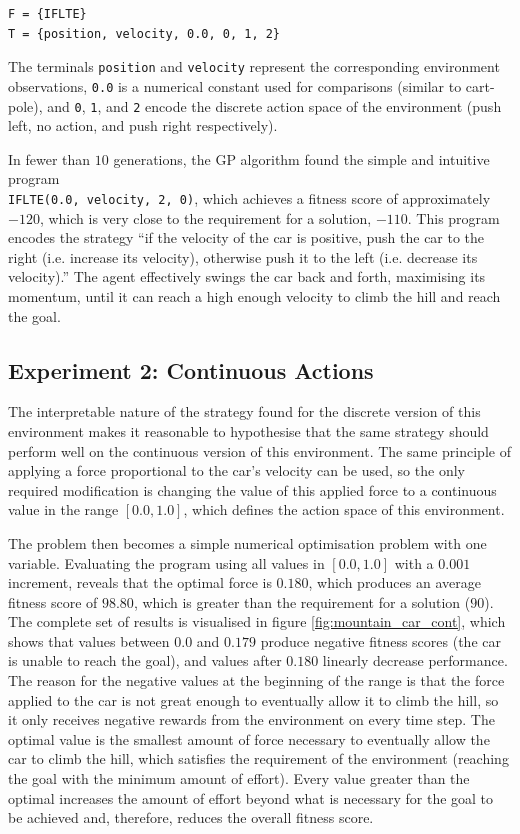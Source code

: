 \begin{verbatim}
F = {IFLTE}
T = {position, velocity, 0.0, 0, 1, 2}
\end{verbatim}
The terminals \verb+position+ and \verb+velocity+ represent the corresponding environment observations, \verb+0.0+ is a numerical constant used for comparisons (similar to cart-pole), and \verb+0+, \verb+1+, and \verb+2+ encode the discrete action space of the environment (push left, no action, and push right respectively).

In fewer than $10$ generations, the GP algorithm found the simple and intuitive program \\\verb+IFLTE(0.0, velocity, 2, 0)+, which achieves a fitness score of approximately $-120$, which is very close to the requirement for a solution, $-110$. This program encodes the strategy “if the velocity of the car is positive, push the car to the right (i.e. increase its velocity), otherwise push it to the left (i.e. decrease its velocity).” The agent effectively swings the car back and forth, maximising its momentum, until it can reach a high enough velocity to climb the hill and reach the goal. 

\subsection{Experiment 2: Continuous Actions}
The interpretable nature of the strategy found for the discrete version of this environment makes it reasonable to hypothesise that the same strategy should perform well on the continuous version of this environment. The same principle of applying a force proportional to the car’s velocity can be used, so the only required modification is changing the value of this applied force to a continuous value in the range $[0.0, 1.0]$, which defines the action space of this environment. 

The problem then becomes a simple numerical optimisation problem with one variable. Evaluating the program using all values in $[0.0, 1.0]$ with a $0.001$ increment, reveals that the optimal force is $0.180$, which produces an average fitness score of $98.80$, which is greater than the requirement for a solution ($90$). The complete set of results is visualised in figure \ref{fig:mountain_car_cont}, which shows that values between $0.0$ and $0.179$ produce negative fitness scores (the car is unable to reach the goal), and values after $0.180$ linearly decrease performance. The reason for the negative values at the beginning of the range is that the force applied to the car is not great enough to eventually allow it to climb the hill, so it only receives negative rewards from the environment on every time step. The optimal value is the smallest amount of force necessary to eventually allow the car to climb the hill, which satisfies the requirement of the environment (reaching the goal with the minimum amount of effort). Every value greater than the optimal increases the amount of effort beyond what is necessary for the goal to be achieved and, therefore, reduces the overall fitness score.

